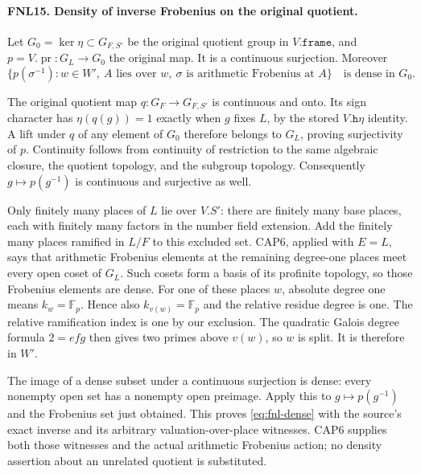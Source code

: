 \documentclass[11pt,a4paper]{article}
\numberwithin{equation}{section}
\theoremstyle{remark}\newtheorem{remark}[theorem]{Remark}
\begin{document}
\paragraph{FNL15. Density of inverse Frobenius on the original quotient.}
\label{claim:FNL15}
Let \(G_0=\ker\eta\subset G_{F,\allowbreak{} S'}\) be the original quotient group
in \(V.\texttt{frame}\), and
\(p=V.\operatorname{pr}:G_L\to G_0\) the original map.  It is a
continuous surjection.  Moreover
\begin{equation}\label{eq:fnl-dense}
 \{p(\sigma^{-1}):w\in W',\ A\text{ lies over }w,\
       \sigma\text{ is arithmetic Frobenius at }A\}
                    \quad\text{is dense in }G_0.
\end{equation}

The original quotient map \(q:G_F\to G_{F,\allowbreak{} S'}\) is continuous and
onto.  Its sign character has
\(\eta(q(g))=1\) exactly when \(g\) fixes \(L\), by the stored
\(V.\texttt{h}\eta\) identity.  A lift under \(q\) of any element
of \(G_0\) therefore belongs to \(G_L\), proving surjectivity of
\(p\).  Continuity follows from continuity of restriction to the
same algebraic closure, the quotient topology, and the subgroup
topology.  Consequently \(g\mapsto p(g^{-1})\) is continuous and
surjective as well.

Only finitely many places of \(L\) lie over \(V.S'\): there are
finitely many base places, each with finitely many factors in the
number field extension.  Add the finitely many places ramified in
\(L/F\) to this excluded set.  CAP6, applied with \(E=L\), says
that arithmetic Frobenius elements at the remaining degree-one
places meet every open coset of \(G_L\).  Such cosets form a basis
of its profinite topology, so those Frobenius elements are dense.
For one of these places \(w\), absolute degree one means
\(k_w=\mathbb F_p\).  Hence also \(k_{v(w)}=\mathbb F_p\) and the
relative residue degree is one.  The relative ramification index is
one by our exclusion.  The quadratic Galois degree formula
\(2=e f g\) then gives two primes above \(v(w)\), so \(w\) is split.
It is therefore in \(W'\).

The image of a dense subset under a continuous surjection is dense:
every nonempty open set has a nonempty open preimage.  Apply this
to \(g\mapsto p(g^{-1})\) and the Frobenius set just obtained.
This proves \eqref{eq:fnl-dense} with the source's exact inverse
and its arbitrary valuation-over-place witnesses.  CAP6 supplies
both those witnesses and the actual arithmetic Frobenius action;
no density assertion about an unrelated quotient is substituted.
\end{document}
